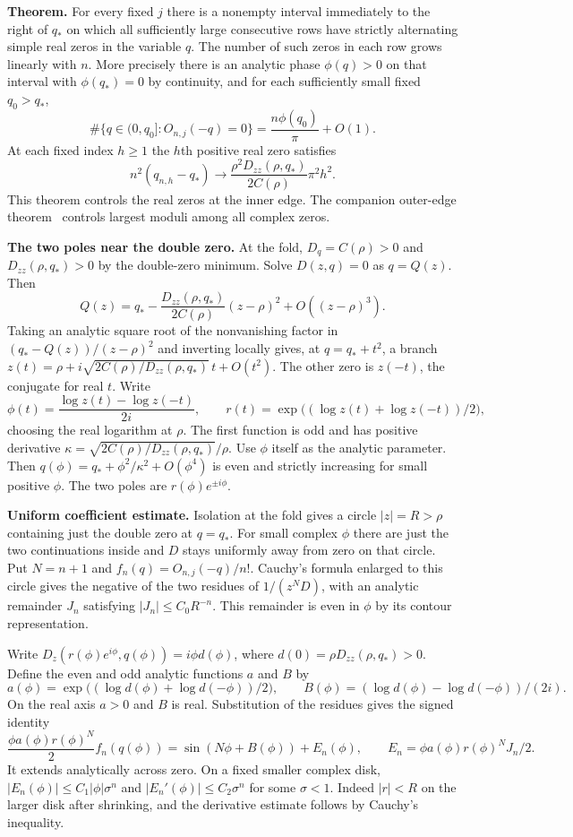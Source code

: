 \documentclass[11pt]{article}
\begin{document}
\textbf{Theorem.} For every fixed $j$ there is a nonempty interval immediately to the right of $q_*$ on which all sufficiently large consecutive rows have strictly alternating simple real zeros in the variable $q$. The number of such zeros in each row grows linearly with $n$. More precisely there is an analytic phase $\phi(q)>0$ on that interval with $\phi(q_*)=0$ by continuity, and for each sufficiently small fixed $q_0>q_*$,
\[
\#\{q\in(0,q_0]:O_{n,j}(-q)=0\}=\frac{n\phi(q_0)}{\pi}+O(1).
\]
At each fixed index $h\ge1$ the $h$th positive real zero satisfies
\[
n^2(q_{n,h}-q_*)\longrightarrow
  \frac{\rho^2D_{zz}(\rho,q_*)}{2C(\rho)}\pi^2 h^2 .
\]
This theorem controls the real zeros at the inner edge. The companion outer-edge theorem~\cite{companion} controls largest moduli among all complex zeros.

\textbf{The two poles near the double zero.} At the fold, $D_q=C(\rho)>0$ and $D_{zz}(\rho,q_*)>0$ by the double-zero minimum. Solve $D(z,q)=0$ as $q=Q(z)$. Then
\[
Q(z)=q_*-\frac{D_{zz}(\rho,q_*)}{2C(\rho)}(z-\rho)^2+O((z-\rho)^3).
\]
Taking an analytic square root of the nonvanishing factor in $(q_*-Q(z))/(z-\rho)^2$ and inverting locally gives, at $q=q_*+t^2$, a branch $z(t)=\rho+i\sqrt{2C(\rho)/D_{zz}(\rho,q_*)}\,t+O(t^2)$. The other zero is $z(-t)$, the conjugate for real $t$. Write
\[
\phi(t)=\frac{\log z(t)-\log z(-t)}{2i},\qquad
 r(t)=\exp\big((\log z(t)+\log z(-t))/2\big),
\]
choosing the real logarithm at $\rho$. The first function is odd and has positive derivative $\kappa=\sqrt{2C(\rho)/D_{zz}(\rho,q_*)}/\rho$. Use $\phi$ itself as the analytic parameter. Then $q(\phi)=q_*+\phi^2/\kappa^2+O(\phi^4)$ is even and strictly increasing for small positive $\phi$. The two poles are $r(\phi)e^{\pm i\phi}$.

\textbf{Uniform coefficient estimate.} Isolation at the fold gives a circle $|z|=R>\rho$ containing just the double zero at $q=q_*$. For small complex $\phi$ there are just the two continuations inside and $D$ stays uniformly away from zero on that circle. Put $N=n+1$ and $f_n(q)=O_{n,j}(-q)/n!$. Cauchy's formula enlarged to this circle gives the negative of the two residues of $1/(z^N D)$, with an analytic remainder $J_n$ satisfying $|J_n|\le C_0 R^{-n}$. This remainder is even in $\phi$ by its contour representation.

Write $D_z(r(\phi)e^{i\phi},q(\phi))=i\phi d(\phi)$, where $d(0)=\rho D_{zz}(\rho,q_*)>0$. Define the even and odd analytic functions $a$ and $B$ by
\[
a(\phi)=\exp\big((\log d(\phi)+\log d(-\phi))/2\big),\qquad
 B(\phi)=(\log d(\phi)-\log d(-\phi))/(2i).
\]
On the real axis $a>0$ and $B$ is real. Substitution of the residues gives the signed identity
\[
\frac{\phi a(\phi)r(\phi)^N}{2} f_n(q(\phi))
 =\sin(N\phi+B(\phi))+E_n(\phi),\qquad
 E_n=\phi a(\phi)r(\phi)^N J_n/2 .
\]
It extends analytically across zero. On a fixed smaller complex disk, $|E_n(\phi)|\le C_1|\phi|\sigma^n$ and $|E_n'(\phi)|\le C_2\sigma^n$ for some $\sigma<1$. Indeed $|r|<R$ on the larger disk after shrinking, and the derivative estimate follows by Cauchy's inequality.
\end{document}
